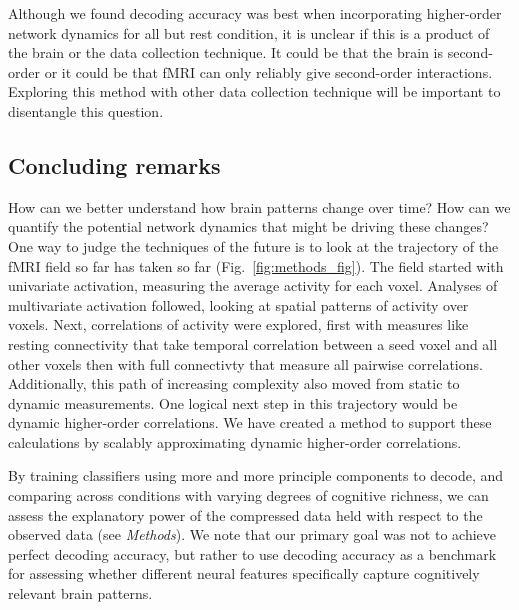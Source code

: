 Although we found decoding accuracy was best when incorporating
higher-order network dynamics for all but rest
  condition, it is unclear if this is a product of the brain or the
  data collection technique.  It could be that the brain is
  second-order or it could be that fMRI can
  only reliably give second-order interactions. Exploring this method
  with other data collection technique will be important to
  disentangle this question.



  \subsection*{Concluding remarks}

How can we better understand how brain patterns change over
time? How can we quantify the potential network dynamics that might be
driving these changes? One way to judge the techniques of the future is
to look at the trajectory of the fMRI field so far has taken so far
(Fig.~\ref{fig:methods_fig}).  The field started with 
univariate activation, measuring the average activity for each voxel.
Analyses of multivariate activation followed, looking at spatial patterns of
activity over voxels. Next, correlations of activity were explored, first
with measures like resting connectivity that take temporal correlation
between a seed voxel and all other voxels then with full connectivty
that measure all pairwise correlations.  Additionally, this path of increasing
complexity also moved from static to dynamic measurements.  One
logical next step in this trajectory would be dynamic higher-order
correlations. We have created a method 
to support these calculations by scalably approximating dynamic higher-order
correlations.  









By training classifiers using more and more principle components to decode, and comparing across conditions with varying degrees of cognitive richness, we can assess the explanatory power of the compressed data held with respect to the observed data (see \textit{Methods}). We note that our primary goal was not to achieve perfect decoding accuracy, but rather to use decoding accuracy as a benchmark for assessing whether different neural features specifically capture cognitively relevant brain patterns.

